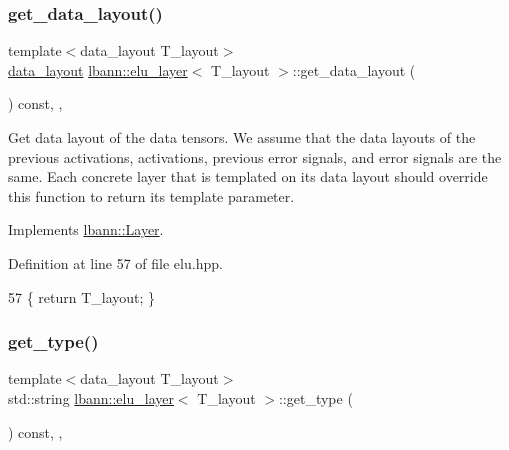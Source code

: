 \subsubsection{\texorpdfstring{get\+\_\+data\+\_\+layout()}{get\_data\_layout()}}
{\footnotesize\ttfamily template$<$data\+\_\+layout T\+\_\+layout$>$ \\
\hyperlink{base_8hpp_a786677cbfb3f5677b4d84f3056eb08db}{data\+\_\+layout} \hyperlink{classlbann_1_1elu__layer}{lbann\+::elu\+\_\+layer}$<$ T\+\_\+layout $>$\+::get\+\_\+data\+\_\+layout (\begin{DoxyParamCaption}{ }\end{DoxyParamCaption}) const\hspace{0.3cm}{\ttfamily [inline]}, {\ttfamily [override]}, {\ttfamily [virtual]}}

Get data layout of the data tensors. We assume that the data layouts of the previous activations, activations, previous error signals, and error signals are the same. Each concrete layer that is templated on its data layout should override this function to return its template parameter. 

Implements \hyperlink{classlbann_1_1Layer_a5dfb66e81fc085997402a5e2241316bd}{lbann\+::\+Layer}.



Definition at line 57 of file elu.\+hpp.


\begin{DoxyCode}
57 \{ \textcolor{keywordflow}{return} T\_layout; \}
\end{DoxyCode}
\mbox{\label{classlbann_1_1elu__layer_a7597f25495bd76ae8716ffd2bfb7afa2}} 
\subsubsection{\texorpdfstring{get\+\_\+type()}{get\_type()}}
{\footnotesize\ttfamily template$<$data\+\_\+layout T\+\_\+layout$>$ \\
std\+::string \hyperlink{classlbann_1_1elu__layer}{lbann\+::elu\+\_\+layer}$<$ T\+\_\+layout $>$\+::get\+\_\+type (\begin{DoxyParamCaption}{ }\end{DoxyParamCaption}) const\hspace{0.3cm}{\ttfamily [inline]}, {\ttfamily [override]}, {\ttfamily [virtual]}}

